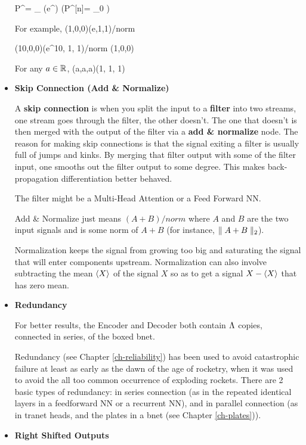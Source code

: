 \begin{itemize}
\beq
P^\alp=
{\sum_{\alp\in[n]} \exp(e^\alp )}
\;\;
\left(P^{[n]}=
{_0}
\right)
\eeq

For example,
\beq
(1,0,0)\rarrow (e,1,1)/norm
\eeq

\beq
(10,0,0)\rarrow (e^{10}, 1, 1)/norm \approx (1,0,0)
\eeq

For any $a\in{ \mathbb{R}}$,
\beq
(a,a,a)\rarrow {}(1, 1, 1)
\eeq


\item {\bf Skip Connection (Add \& Normalize)}

A {\bf skip connection} is when you split the
input to a {\bf filter} into two streams, one stream goes through
the filter, the other doesn't. The one that doesn't
is then merged with the output of the filter via a {\bf add \& normalize} node. The reason for making skip connections
is that the signal exiting a filter is usually full of
jumps and kinks. By merging that filter output
with some  of the filter input, one smooths out the filter output
to some degree. This makes back-propagation differentiation
better behaved.

The filter might be a Multi-Head Attention or a Feed Forward NN.

Add \& Normalize just means $(A + B)/norm$ where $A$ and $B$
are the two input signals and  is some norm of $A+B$ (for
instance, $\parallel A+B\parallel_2$).

Normalization keeps the signal from growing too big and saturating the signal that will enter components upstream.
Normalization can also involve subtracting the mean $\left\langle X\right\rangle$ of the signal $X$  so as to get a signal $X-\left\langle X\right\rangle$  that has zero mean.

\item {\bf Redundancy}

For better results, the Encoder
and Decoder both contain $\Lambda$
copies, connected in series, of the boxed bnet.

Redundancy (see Chapter \ref{ch-reliability}) has been used to
avoid catastrophic failure at least as early as
the dawn of the age
of rocketry, when it
was used to avoid the all too common
occurrence of exploding rockets.
There are 2 basic types of
redundancy: in series connection (as in the repeated identical
layers in a feedforward
NN or a recurrent NN),
and in parallel connection (as in
tranet heads, and the plates in a bnet (see Chapter \ref{ch-plates})).

\item{\bf Right Shifted Outputs}


\end{itemize}
